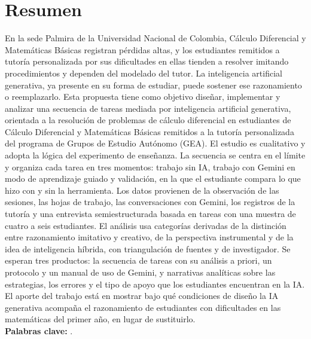 \newpage
\thispagestyle{empty}
\chapter*{\sffamily Resumen}
%
\par En la sede Palmira de la Universidad Nacional de Colombia, Cálculo
Diferencial y Matemáticas Básicas registran pérdidas altas, y los estudiantes
remitidos a tutoría personalizada por sus dificultades en ellas tienden a
resolver imitando procedimientos y dependen del modelado del tutor. La
inteligencia artificial generativa, ya presente en su forma de estudiar, puede
sostener ese razonamiento o reemplazarlo. Esta propuesta tiene como objetivo
diseñar, implementar y analizar una secuencia de tareas mediada por inteligencia
artificial generativa, orientada a la resolución de problemas de cálculo
diferencial en estudiantes de Cálculo Diferencial y Matemáticas Básicas remitidos
a la tutoría personalizada del programa de Grupos de Estudio Autónomo (GEA). El
estudio es cualitativo y adopta la lógica del experimento de enseñanza. La
secuencia se centra en el límite y organiza cada tarea en tres momentos: trabajo
sin IA, trabajo con Gemini en modo de aprendizaje guiado y validación, en la que
el estudiante compara lo que hizo con y sin la herramienta. Los datos provienen
de la observación de las sesiones, las hojas de trabajo, las conversaciones con
Gemini, los registros de la tutoría y una entrevista semiestructurada basada en
tareas con una muestra de cuatro a seis estudiantes. El análisis usa categorías
derivadas de la distinción entre razonamiento imitativo y creativo, de la
perspectiva instrumental y de la idea de inteligencia híbrida, con triangulación
de fuentes y de investigador. Se esperan tres productos: la secuencia de tareas
con su análisis a priori, un protocolo y un manual de uso de Gemini, y
narrativas analíticas sobre las estrategias, los errores y el tipo de apoyo que
los estudiantes encuentran en la IA. El aporte del trabajo está en mostrar bajo
qué condiciones de diseño la IA generativa acompaña el razonamiento de
estudiantes con dificultades en las matemáticas del primer año, en lugar de
sustituirlo.
\\[1cm]
\textbf{Palabras clave:} \palabrasclave.

